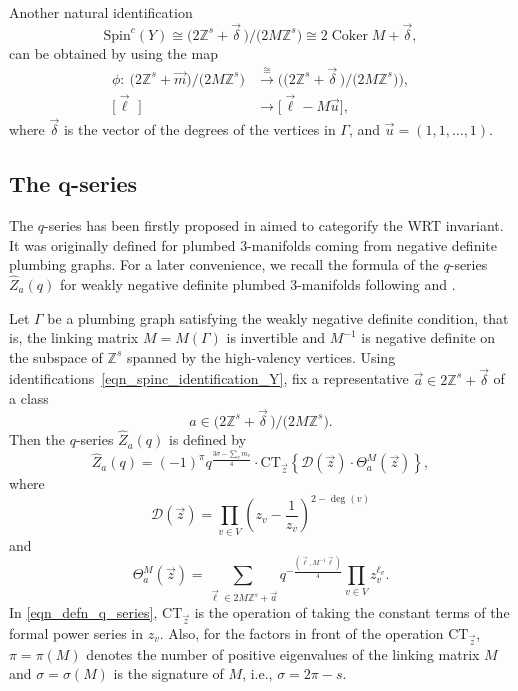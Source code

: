 \documentclass[pdftex]{sigma}
\numberwithin{equation}{section}
\begin{document}
Another natural identification
\begin{equation}\label{eqn_spinc_identification_Y}
	\text{Spin}^c(Y)\cong \big(2\mathbb{Z}^s+\vec{\delta}\,\big)/\big(2M\mathbb{Z}^s\big) \cong 2\operatorname{Coker}M+\vec{\delta},
\end{equation}
can be obtained by using the map
\[
\begin{split}
	\phi\colon \ \big(2\mathbb{Z}^s+\vec{m}\big)/\big(2M\mathbb{Z}^s\big) & \xrightarrow{\cong} \big(\big(2\mathbb{Z}^s+\vec{\delta}\,\big)/\big(2M\mathbb{Z}^s\big)\big),\\
	\big[\vec{\ell}\,\,\big] & \rightarrow \big[\vec{\ell}-M\vec{u}\big],
\end{split}
\]
where $ \vec{\delta} $ is the vector of the degrees of the vertices in $ \Gamma $, and $ \vec{u}=(1,1,\dots,1) $.

\subsection[The q-series]{The $\boldsymbol{q}$-series}

The $ q $-series has been firstly proposed in \cite{gppv} aimed to categorify the WRT invariant. It was originally defined for plumbed 3-manifolds coming from negative definite plumbing graphs. For a later convenience, we recall the formula of the $ q $-series $ \hat{Z}_a(q) $ for weakly negative definite plumbed 3-manifolds following \cite{gukov} and \cite{gppv}.

Let $ \Gamma $ be a plumbing graph satisfying the weakly negative definite condition, that is, the linking matrix $ M=M(\Gamma) $ is invertible and $ M^{-1} $ is negative definite on the subspace of $\mathbb{Z}^s$ spanned by the high-valency vertices. Using identifications~\eqref{eqn_spinc_identification_Y}, fix a representative $ \vec{a}\in 2\mathbb{Z}^s+\vec{\delta} $ of a class
\[
a\in \big(2\mathbb{Z}^s+\vec{\delta}\,\big)/\big(2M\mathbb{Z}^s\big).
\]
Then the $ q $-series $ \hat{Z}_a(q) $ is defined by
\begin{equation}\label{eqn_defn_q_series}
	\hat{Z}_a(q)=(-1)^{\pi}  q^{\frac{3\sigma-\sum_v m_v}{4}} \cdot \text{CT}_{\vec{z}}\left\{ \mathcal{D}(\vec{z}) \cdot \Theta_a^{M}(\vec{z})\right\},
\end{equation}
where
\begin{equation}\label{eqn_defn_discriminant_q_series}
	\mathcal{D}(\vec{z})=\prod_{v\in V} \left(z_v-\frac{1}{z_v}\right)^{2-\deg(v)}
\end{equation}
and
\begin{equation}\label{eqn_defn_Theta_function_q_series}
	\Theta_a^{M}(\vec{z})=\sum_{\vec{\ell}\in 2M\mathbb{Z}^s+\vec{a}} q^{-\frac{(\vec{\ell},M^{-1}\vec{\ell})}{4}} \prod_{v\in V} z_v^{\ell_v}.
\end{equation}
In \eqref{eqn_defn_q_series}, $ \text{CT}_{\vec{z}}$ is the operation of taking the constant terms of the formal power series in $z_v$. Also, for the factors in front of the operation $ \text{CT}_{\vec{z}}$, $ \pi=\pi(M) $ denotes the number of positive eigenvalues of the linking matrix $ M $ and $ \sigma=\sigma(M) $ is the signature of $ M $, i.e., $ \sigma=2\pi-s $.
\end{document}
